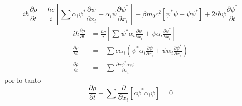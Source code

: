 \begin{equation*}
    i\hbar \frac{\partial \rho}{\partial t} = \frac{\hbar c}{i} \left[\sum \alpha_i \psi^* \frac{\partial \psi}{\partial x_i}- \alpha_i \psi \frac{\partial \psi^*}{\partial x_i}\right]+ \beta m_0c^2\left[\psi^* \psi - \psi \psi^*\right] + 2 i\hbar \psi \frac{\partial \psi^*}{\partial t}
\end{equation*}
\begin{align*}
    i\hbar \frac{\partial \rho}{\partial t}  &= \frac{\hbar c}{i} \left[\sum \psi^* \alpha_i\frac{\partial \psi}{\partial x_i}+ \psi \alpha_i\frac{\partial \psi^*}{\partial x_i}\right]\\
    \frac{\partial \rho}{\partial t} &= -\sum c\alpha_i\left( \psi^*\alpha_i \frac{\partial \psi}{\partial x_i}+\psi \alpha_i\frac{\partial \psi^*}{\partial x_i}\right)\\
    \frac{\partial \rho}{\partial t} & = - \sum \frac{\partial c\psi^* \alpha_i \psi}{\partial x_i}
\end{align*}
por lo tanto
\begin{equation*}
    \frac{\partial \rho}{\partial t} + \sum \frac{\partial}{\partial x_i}\left[ c\psi^* \alpha_i \psi\right]=0
\end{equation*}